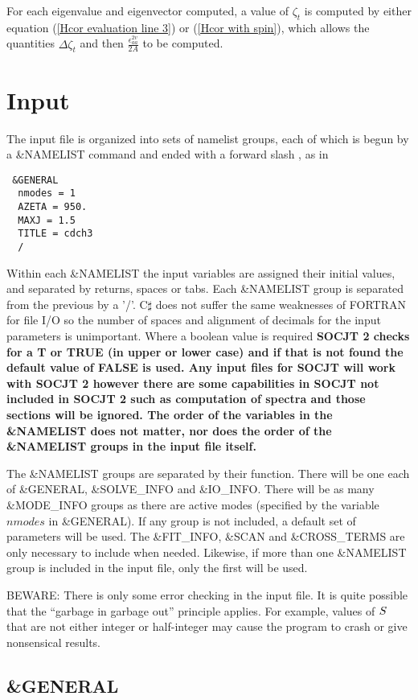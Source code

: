 \documentclass{article}
\newcommand{\socjttwo}{\bf{SOCJT 2 }}
\newcommand{\socjt}{{\bf SOCJT }}
\begin{document}
For each eigenvalue and eigenvector computed, a value of $\zeta _t$ is
computed by either equation (\ref{Hcor evaluation line 3}) or 
(\ref{Hcor with spin}), which allows the quantities $\Delta \zeta _t $
and then $\frac{\epsilon _{aa}^{2v}}{2A}$ to be computed.

\section{Input} \label{section:input}

The input file is organized into sets of namelist groups, each of
which is begun by a \&NAMELIST command and ended with a forward slash
\/, as in 
\begin{verbatim}
 &GENERAL 
  nmodes = 1
  AZETA = 950.
  MAXJ = 1.5
  TITLE = cdch3 
  /
\end{verbatim}
Within each \&NAMELIST the input variables are assigned their initial
values, and separated by returns, spaces or tabs. Each \&NAMELIST group is separated from
the previous by a '/'. C$\sharp$ does not suffer the same weaknesses of FORTRAN for file I/O
so the number of spaces and alignment of decimals for the input parameters is unimportant.
Where a boolean value is required \socjttwo checks for a T or TRUE (in upper or lower case)
and if that is not found the default value of FALSE is used. Any input files for \socjt will work
with \socjttwo however there are some capabilities in \socjt not included in \socjttwo such as 
computation of spectra and those sections will be ignored. The order of the variables in
the \&NAMELIST does not matter, nor does the order of the \&NAMELIST
groups in the input file itself.

The \&NAMELIST groups are separated by their function. There will be one each of
\&GENERAL, \&SOLVE\_INFO and \&IO\_INFO. There will be as many \&MODE\_INFO groups as there are active modes
(specified by the variable $nmodes$ in \&GENERAL). If any group is not included,
a default set of parameters will be used. The \&FIT\_INFO, \&SCAN and \&CROSS\_TERMS 
are only necessary to include when needed. Likewise, if more than one
\&NAMELIST group is included in the input file, only the first will be
used. 

BEWARE: There is only some error checking in the input file. It is
quite possible that the ``garbage in garbage out'' principle
applies. For example, values of ${\bf S}$ that are not either integer
or half-integer may cause the program to crash or give nonsensical
results.

\subsection{\&GENERAL}
\end{document}
